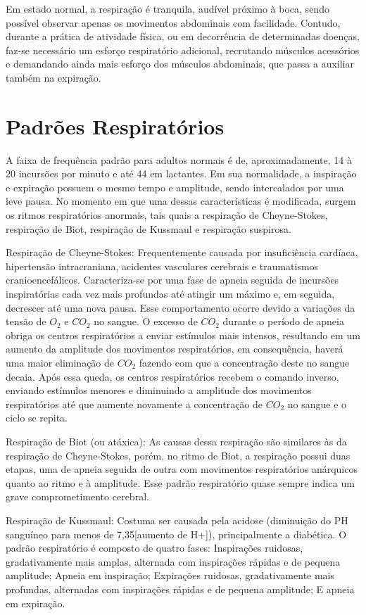 	Em estado normal, a respiração é tranquila, audível próximo à boca, sendo possível observar apenas os movimentos abdominais com facilidade. Contudo, durante a prática de atividade física, ou em decorrência de determinadas doenças, faz-se necessário um esforço respiratório adicional, recrutando músculos acessórios e demandando ainda mais esforço dos músculos abdominais, que passa a auxiliar também na expiração.
	
\section{Padrões Respiratórios} \label{sec:padroesrespiratorios}

	A faixa de frequência padrão para adultos normais é de, aproximadamente, 14 à 20 incursões por minuto e até 44 em lactantes. Em sua normalidade, a inspiração e expiração possuem o mesmo tempo e amplitude, sendo intercalados por uma leve pausa. No momento em que uma dessas características é modificada, surgem os ritmos respiratórios anormais, tais quais a respiração de Cheyne-Stokes, respiração de Biot, respiração de Kussmaul e respiração suspirosa.
	
	Respiração de Cheyne-Stokes: Frequentemente causada por insuficiência cardíaca, hipertensão intracraniana, acidentes vasculares cerebrais e traumatismos cranioencefálicos. Caracteriza-se por uma fase de apneia seguida de incursões inspiratórias cada vez mais profundas até atingir um máximo e, em seguida, decrescer até uma nova pausa. Esse comportamento ocorre devido a variações da tensão de $O_2$ e $CO_2$ no sangue. O excesso de $CO_2$ durante o período de apneia obriga os centros respiratórios a enviar estímulos mais intensos, resultando em um aumento da amplitude dos movimentos respiratórios, em consequência, haverá uma maior eliminação de $CO_2$ fazendo com que a concentração deste no sangue decaia. Após essa queda, os centros respiratórios recebem o comando inverso, enviando estímulos menores e diminuindo a amplitude dos movimentos respiratórios até que aumente novamente a concentração de $CO_2$ no sangue e o ciclo se repita.
	
	Respiração de Biot (ou atáxica): As causas dessa respiração são similares às da respiração de Cheyne-Stokes, porém, no ritmo de Biot, a respiração possui duas etapas, uma de apneia seguida de outra com movimentos respiratórios anárquicos quanto ao ritmo e à amplitude. Esse padrão respiratório quase sempre indica um grave comprometimento cerebral.
	
	Respiração de Kussmaul: Costuma ser causada pela acidose (diminuição do PH sanguíneo para menos de 7,35[aumento de H+]), principalmente a diabética. O padrão respiratório é composto de quatro fases: Inspirações ruidosas, gradativamente mais amplas, alternada com inspirações rápidas e de pequena amplitude; Apneia em inspiração; Expirações ruidosas, gradativamente mais profundas, alternadas com inspirações rápidas e de pequena amplitude;	
	E apneia em expiração.
	
